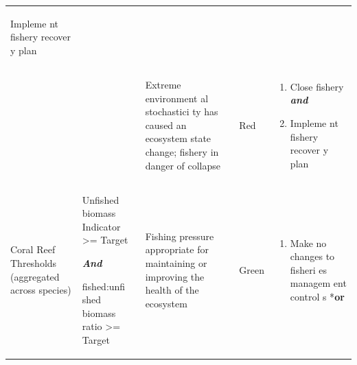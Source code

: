 \documentclass[]{book}
\providecommand{\tightlist}{%
  \setlength{\itemsep}{0pt}\setlength{\parskip}{0pt}}
\begin{document}
\begin{longtable}[]{@{}lllll@{}}
\begin{minipage}[t]{0.19\columnwidth}
\begin{enumerate}
  Impleme nt fishery recover y plan
\end{enumerate}\strut
\end{minipage}\tabularnewline
\begin{minipage}[t]{0.19\columnwidth}\raggedright\strut
\strut
\end{minipage} & \begin{minipage}[t]{0.19\columnwidth}\raggedright\strut
\strut
\end{minipage} & \begin{minipage}[t]{0.19\columnwidth}\raggedright\strut
Extreme environment al stochastici ty has caused an ecosystem state
change; fishery in danger of collapse\strut
\end{minipage} & \begin{minipage}[t]{0.19\columnwidth}\raggedright\strut
Red\strut
\end{minipage} & \begin{minipage}[t]{0.19\columnwidth}\raggedright\strut
\begin{enumerate}
\def\labelenumi{\arabic{enumi}.}
\item
  Close fishery \textbf{\emph{and} }
\item
  Impleme nt fishery recover y plan
\end{enumerate}\strut
\end{minipage}\tabularnewline
\begin{minipage}[t]{0.19\columnwidth}\raggedright\strut
Coral Reef Thresholds (aggregated across species)\strut
\end{minipage} & \begin{minipage}[t]{0.19\columnwidth}\raggedright\strut
Unfished biomass Indicator \textgreater{}= Target

\textbf{\emph{And}}

fished:unfi shed biomass ratio \textgreater{}= Target\strut
\end{minipage} & \begin{minipage}[t]{0.19\columnwidth}\raggedright\strut
Fishing pressure appropriate for maintaining or improving the health of
the ecosystem\strut
\end{minipage} & \begin{minipage}[t]{0.19\columnwidth}\raggedright\strut
Green\strut
\end{minipage} & \begin{minipage}[t]{0.19\columnwidth}\raggedright\strut
\begin{enumerate}
\def\labelenumi{\arabic{enumi}.}
\tightlist
\item
  Make no changes to fisheri es managem ent control s *\textbf{or}
\end{enumerate}


\end{minipage}
\end{longtable}
\end{document}
